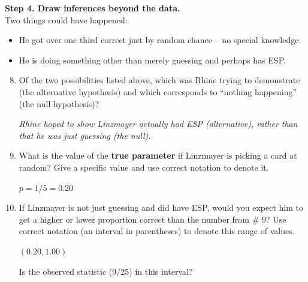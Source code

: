 {\bf Step 4. Draw inferences beyond the data. }\\
Two things could have happened:\vspace{-.5cm}
\begin{itemize}
\item He got over one third correct just by  random chance -- no
  special knowledge.  
\item He is doing something other than merely guessing and perhaps has ESP.
\end{itemize}

 \begin{enumerate}
   \setcounter{enumi}{7}
   \item   Of the two possibilities listed above, which was Rhine
     trying to demonstrate (the alternative hypothesis) and which corresponds to
     ``nothing happening'' (the null hypothesis)? 
\begin{students}
  \vspace{1cm}
\end{students}

\begin{key}
{\it Rhine hoped to show Linzmayer actually had ESP (alternative),
  rather than that he was just guessing (the null).}
\end{key}

\item\label{trueESP-p} What is the value of the {\bf true parameter} if
  Linzmayer is picking a card at random? Give a specific value and use
  correct notation to denote it. 
\begin{students}
  \vspace{1cm}
\end{students}

\begin{key}
$p = 1/5 = 0.20$
\end{key}


\item If Linzmayer is not just guessing and did have ESP, would you
  expect him to get a higher or lower proportion correct than the
  number from \# 9? Use correct notation (an interval in parentheses)
  to denote this range of values.
\begin{students}
  \vspace{1cm}
\end{students}

\begin{key}
$(0.20, 1.00)$
\end{key}
     Is the observed statistic (9/25) in this interval?
\begin{students}
  \vspace{0.4cm}
\end{students}


\end{enumerate}
